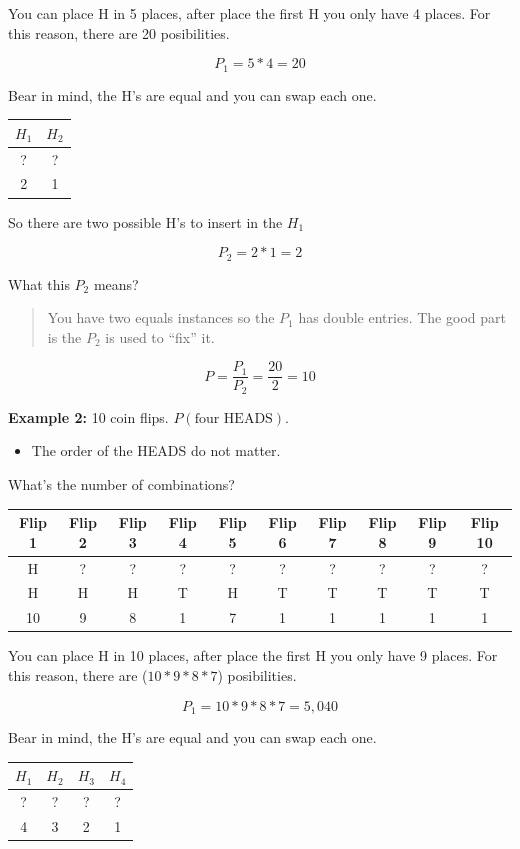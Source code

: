 \documentclass[]{book}
\providecommand{\tightlist}{%
  \setlength{\itemsep}{0pt}\setlength{\parskip}{0pt}}
\begin{document}
You can place H in 5 places, after place the first H you only have 4
places. For this reason, there are 20 posibilities.

\[ P_1 = 5 * 4 = 20 \]

Bear in mind, the H's are equal and you can swap each one.

\begin{longtable}[]{@{}cc@{}}
\toprule
\(H_1\) & \(H_2\)\tabularnewline
\midrule
\endhead
? & ?\tabularnewline
2 & 1\tabularnewline
\bottomrule
\end{longtable}

So there are two possible H's to insert in the \(H_1\)

\[ P_2 = 2 * 1 = 2 \]

What this \(P_2\) means?

\begin{quote}
You have two equals instances so the \(P_1\) has double entries. The
good part is the \(P_2\) is used to ``fix'' it.
\end{quote}

\[ P = \frac{P_1}{P_2} = \frac{20}{2} = 10 \]

\textbf{Example 2:} 10 coin flips. \(P(\text{four HEADS})\).

\begin{itemize}
\tightlist
\item
  The order of the HEADS do not matter.
\end{itemize}

What's the number of combinations?

\begin{longtable}[]{@{}cccccccccc@{}}
\toprule
Flip 1 & Flip 2 & Flip 3 & Flip 4 & Flip 5 & Flip 6 & Flip 7 & Flip 8 &
Flip 9 & Flip 10\tabularnewline
\midrule
\endhead
H & ? & ? & ? & ? & ? & ? & ? & ? & ?\tabularnewline
H & H & H & T & H & T & T & T & T & T\tabularnewline
10 & 9 & 8 & 1 & 7 & 1 & 1 & 1 & 1 & 1\tabularnewline
\bottomrule
\end{longtable}

You can place H in 10 places, after place the first H you only have 9
places. For this reason, there are (\(10*9*8*7\)) posibilities.

\[ P_1 = 10*9*8*7 = 5,040 \]

Bear in mind, the H's are equal and you can swap each one.

\begin{longtable}[]{@{}cccc@{}}
\toprule
\(H_1\) & \(H_2\) & \(H_3\) & \(H_4\)\tabularnewline
\midrule
\endhead
? & ? & ? & ?\tabularnewline
4 & 3 & 2 & 1\tabularnewline
\bottomrule
\end{longtable}
\end{document}
